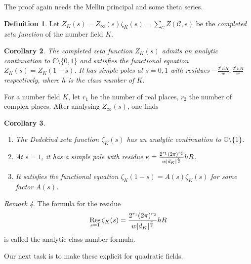 \documentclass[11pt]{article}
\theoremstyle{definition}
\newtheorem{definition}{Definition}[section]
\theoremstyle{plain}
\newtheorem{corollary}[definition]{Corollary}
\theoremstyle{remark}
\newtheorem{remark}[definition]{Remark}
\DeclareMathOperator{\Res}{Res}
\newcommand{\CC}{\mathbb{C}}
\newcommand{\cC}{\mathcal{C}}
\begin{document}
The proof again needs the Mellin principal and some theta series.

\begin{definition}\label{def:6_4}
    Let $Z_K(s) = Z_\infty(s) \zeta_K(s) = \sum_{\cC} Z(\cC, s)$ be the \emph{completed zeta function} of the number field $K$.
\end{definition}

\begin{corollary}\label{cor:6_5}
    The completed zeta function $Z_K(s)$ admits an analytic continuation to $\CC \setminus \{0, 1\}$ and satisfies the functional equation $Z_K(s) = Z_K(1-s)$. It has simple poles at $s=0,1$ with residues $-\frac{2^r h R}{w}, \frac{2^r h R}{w}$ respectively, where $h$ is the class number of $K$.
\end{corollary}

For a number field $K$, let $r_1$ be the number of real places, $r_2$ the number of complex places. After analysing $Z_\infty(s)$, one finds
\begin{corollary}\label{cor:6_6}\phantom{}
    \begin{enumerate}
        \item The Dedekind zeta function $\zeta_K(s)$ has an analytic continuation to $\CC \setminus \{1\}$.
        \item At $s=1$, it has a simple pole with residue $\kappa = \frac{2^{r_1} (2\pi)^{r_2}}{w \, \abs{d_K}^{\frac{r}{2}}} h R$.
        \item It satisfies the functional equation $\zeta_K(1-s) = A(s) \zeta_K(s)$ for some factor $A(s)$.
    \end{enumerate}
\end{corollary}

\begin{remark}\label{rem:6_7}
    The formula for the residue
    \begin{equation*}
        \Res_{s=1} \zeta_K(s) = \frac{2^{r_1} (2 \pi)^{r_2}}{w \abs{d_K}^{\frac{r}{2}}} h R
    \end{equation*}
    is called the analytic class number formula.
\end{remark}

\noindent Our next task is to make these explicit for quadratic fields.
\end{document}
